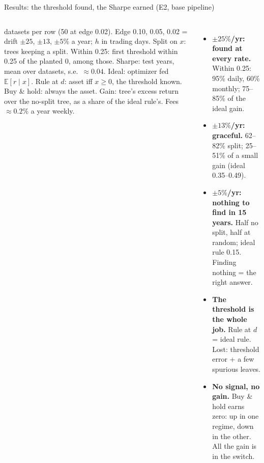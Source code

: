 \documentclass[10pt,aspectratio=169]{beamer}
\newcommand{\1}{\mathbf{1}}
\newcommand{\E}{\mathbb{E}}
\begin{document}
\begin{frame}{Results: the threshold found, the Sharpe earned (E2, base pipeline)}
\begin{columns}[T]
 datasets per row (50 at edge 0.02). Edge 0.10, 0.05, 0.02 = drift $\pm25$, $\pm13$, $\pm5\%$ a year; $h$ in trading days. Split on $x$: trees keeping a split. Within 0.25: first threshold within 0.25 of the planted 0, among those. Sharpe: test years, mean over datasets, s.e.\ $\approx0.04$. Ideal: optimizer fed $\E[r\mid x]$. Rule at $d$: asset iff $x\ge0$, the threshold known. Buy \& hold: always the asset. Gain: tree's excess return over the no-split tree, as a share of the ideal rule's. Fees $\approx0.2\%$ a year weekly.
\footnotesize
\begin{itemize}
\item \textbf{$\pm25\%$/yr: found at every rate.} Within 0.25: 95\% daily, 60\% monthly; 75--85\% of the ideal gain.
\item \textbf{$\pm13\%$/yr: graceful.} 62--82\% split; 25--51\% of a small gain (ideal 0.35--0.49).
\item \textbf{$\pm5\%$/yr: nothing to find in 15 years.} Half no split, half at random; ideal rule 0.15. Finding nothing = the right answer.
\item \textbf{The threshold is the whole job.} Rule at $d$ = ideal rule. Lost: threshold error + a few spurious leaves.
\item \textbf{No signal, no gain.} Buy \& hold earns zero: up in one regime, down in the other. All the gain is in the switch.
\end{itemize}
\end{columns}
\end{frame}
\end{document}
